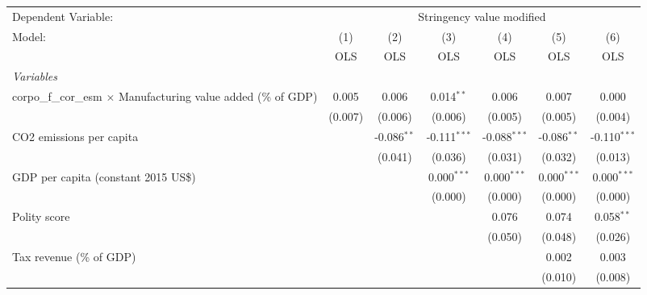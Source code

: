 
\begingroup
\centering
\begin{tabular}{lcccccc}
   \toprule
   Dependent Variable: & \multicolumn{6}{c}{Stringency value modified}\\
   Model:                                                                 & (1)     & (2)           & (3)            & (4)            & (5)           & (6)\\  
                                                                          &  OLS    & OLS           & OLS            & OLS            & OLS           & OLS\\  
   \midrule
   \emph{Variables}\\
   corpo\_f\_cor\_esm $\times$ Manufacturing value added (\% of GDP)      & 0.005   & 0.006         & 0.014$^{**}$   & 0.006          & 0.007         & 0.000\\   
                                                                          & (0.007) & (0.006)       & (0.006)        & (0.005)        & (0.005)       & (0.004)\\   
   CO2 emissions per capita                                               &         & -0.086$^{**}$ & -0.111$^{***}$ & -0.088$^{***}$ & -0.086$^{**}$ & -0.110$^{***}$\\   
                                                                          &         & (0.041)       & (0.036)        & (0.031)        & (0.032)       & (0.013)\\   
   GDP per capita (constant 2015 US\$)                                    &         &               & 0.000$^{***}$  & 0.000$^{***}$  & 0.000$^{***}$ & 0.000$^{***}$\\   
                                                                          &         &               & (0.000)        & (0.000)        & (0.000)       & (0.000)\\   
   Polity score                                                           &         &               &                & 0.076          & 0.074         & 0.058$^{**}$\\   
                                                                          &         &               &                & (0.050)        & (0.048)       & (0.026)\\   
   Tax revenue (\% of GDP)                                                &         &               &                &                & 0.002         & 0.003\\   
                                                                          &         &               &                &                & (0.010)       & (0.008)\\   

\end{tabular}
